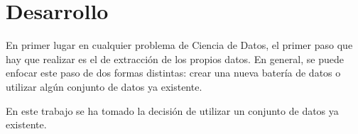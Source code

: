 \chapter*{Desarrollo}
En primer lugar en cualquier problema de Ciencia de Datos, el primer paso que hay que realizar es el de extracción de los propios datos. En general, se puede enfocar este paso de dos formas distintas: crear una nueva batería de datos o utilizar algún conjunto de datos ya existente.

En este trabajo se ha tomado la decisión de utilizar un conjunto de datos ya existente. 
